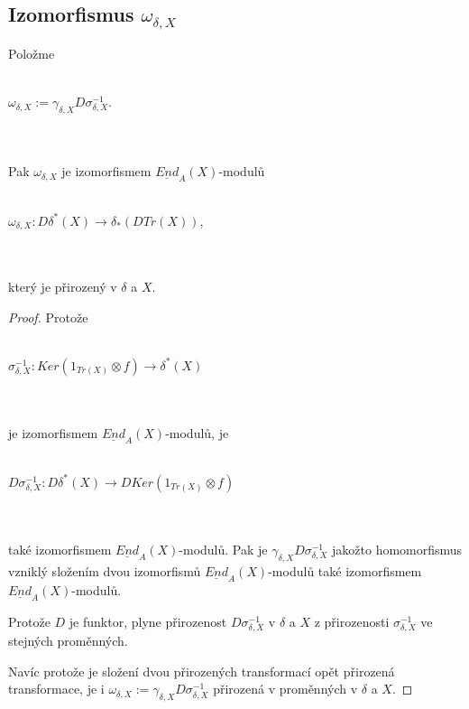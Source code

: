     \subsection{Izomorfismus $\omega_{\delta,X}$} 
    
      \begin{thm}\label{thm-omega}
        Položme \\\\
        \centerline{$\omega_{\delta,X}:=\gamma_{\delta,X}D\sigma^{-1}_{\delta,X}$.}  \\\\        
        Pak $\omega_{\delta,X}$ je izomorfismem $\underline{End}_A(X)$-modulů  \\\\
        \centerline{$\omega_{\delta,X}:D\delta^*(X)\rightarrow \delta_*(DTr(X))$,} \\\\
        který je přirozený v $\delta$ a $X$.        
      \end{thm}
      \begin{proof}
        Protože \\\\
        \centerline{$\sigma^{-1}_{\delta,X}:Ker(1_{Tr(X)}\otimes f)\rightarrow \delta^*(X)$} 
        \\\\
        je izomorfismem $\underline{End}_A(X)$-modulů, je \\\\
        \centerline{$D\sigma^{-1}_{\delta,X}:D\delta^*(X) \rightarrow DKer(1_{Tr(X)}\otimes f)$} 
        \\\\ 
        také izomorfismem $\underline{End}_A(X)$-modulů. Pak je 
        $\gamma_{\delta,X}D\sigma^{-1}_{\delta,X}$ jakožto homomorfismus vzniklý 
        složením dvou izomorfismů $\underline{End}_A(X)$-modulů také
        izomorfismem $\underline{End}_A(X)$-modulů. 
        
        Protože $D$ je funktor, plyne přirozenost $D\sigma^{-1}_{\delta,X}$ v $\delta$ a $X$ z 
        přirozenosti $\sigma^{-1}_{\delta,X}$ ve stejných proměnných.
        
        Navíc protože je složení dvou přirozených 
        transformací opět přirozená transformace, je i 
        $\omega_{\delta,X}:=\gamma_{\delta,X}D\sigma^{-1}_{\delta,X}$
        přirozená v proměnných  v $\delta$ a $X$.
      \end{proof}
      \clearpage
      
